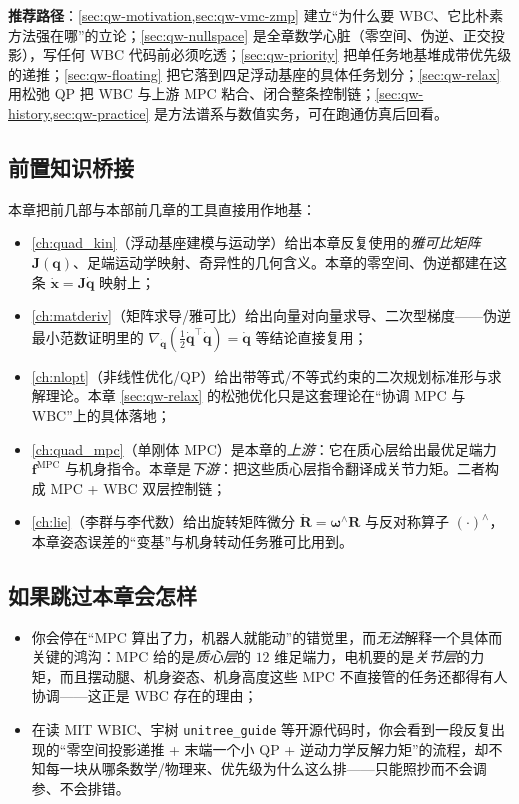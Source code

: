 \noindent\textbf{推荐路径}：\cref{sec:qw-motivation,sec:qw-vmc-zmp} 建立“为什么要 WBC、它比朴素方法强在哪”的立论；\cref{sec:qw-nullspace} 是全章数学心脏（零空间、伪逆、正交投影），写任何 WBC 代码前必须吃透；\cref{sec:qw-priority} 把单任务地基堆成带优先级的递推；\cref{sec:qw-floating} 把它落到四足浮动基座的具体任务划分；\cref{sec:qw-relax} 用松弛 QP 把 WBC 与上游 MPC 粘合、闭合整条控制链；\cref{sec:qw-history,sec:qw-practice} 是方法谱系与数值实务，可在跑通仿真后回看。

\subsection*{前置知识桥接}
本章把前几部与本部前几章的工具直接用作地基：
\begin{itemize}
  \item \cref{ch:quad_kin}（浮动基座建模与运动学）给出本章反复使用的\emph{雅可比矩阵} $\boldsymbol{J}(\boldsymbol{q})$、足端运动学映射、奇异性的几何含义。本章的零空间、伪逆都建在这条 $\dot{\boldsymbol{x}}=\boldsymbol{J}\dot{\boldsymbol{q}}$ 映射上；
  \item \cref{ch:matderiv}（矩阵求导/雅可比）给出向量对向量求导、二次型梯度——伪逆最小范数证明里的 $\nabla_{\dot{\boldsymbol{q}}}(\tfrac12\dot{\boldsymbol{q}}^\top\dot{\boldsymbol{q}})=\dot{\boldsymbol{q}}$ 等结论直接复用；
  \item \cref{ch:nlopt}（非线性优化/QP）给出带等式/不等式约束的二次规划标准形与求解理论。本章 \cref{sec:qw-relax} 的松弛优化只是这套理论在“协调 MPC 与 WBC”上的具体落地；
  \item \cref{ch:quad_mpc}（单刚体 MPC）是本章的\emph{上游}：它在质心层给出最优足端力 $\boldsymbol{f}^{\mathrm{MPC}}$ 与机身指令。本章是\emph{下游}：把这些质心层指令翻译成关节力矩。二者构成 MPC + WBC 双层控制链；
  \item \cref{ch:lie}（李群与李代数）给出旋转矩阵微分 $\dot{\mathbf{R}}=\boldsymbol{\omega}^\wedge\mathbf{R}$ 与反对称算子 $(\cdot)^\wedge$，本章姿态误差的“变基”与机身转动任务雅可比用到。
\end{itemize}

\subsection*{如果跳过本章会怎样}
\begin{itemize}
  \item 你会停在“MPC 算出了力，机器人就能动”的错觉里，而\emph{无法}解释一个具体而关键的鸿沟：MPC 给的是\emph{质心层}的 $12$ 维足端力，电机要的是\emph{关节层}的力矩，而且摆动腿、机身姿态、机身高度这些 MPC 不直接管的任务还都得有人协调——这正是 WBC 存在的理由；
  \item 在读 MIT WBIC、宇树 \texttt{unitree\_guide} 等开源代码时，你会看到一段反复出现的“零空间投影递推 + 末端一个小 QP + 逆动力学反解力矩”的流程，却不知每一块从哪条数学/物理来、优先级为什么这么排——只能照抄而不会调参、不会排错。
\end{itemize}

